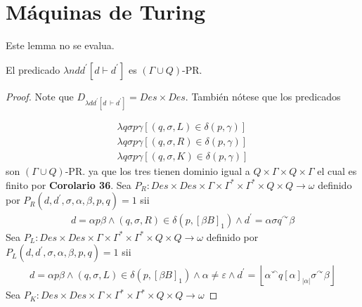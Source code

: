 \section{Máquinas de Turing}

  \begin{lemma}
    \par Este lemma no se evalua.
  \end{lemma}

  \begin{lemma}
  	El predicado $\lambda ndd^{\prime} \left[d\vdash d^{\prime}\right]$ es $(\Gamma \cup Q)$-PR.
	\begin{proof}
	  Note que $D_{\lambda dd^{\prime}\left[d\ \vdash d^{\prime }\right] }=Des\times Des$.
    También nótese que los predicados

    \begin{eqnarray*}
      \lambda q\sigma p\gamma \left[ (q,\sigma ,L)\in \delta (p,\gamma )\right] \\
      \lambda q\sigma p\gamma \left[ (q,\sigma ,R)\in \delta (p,\gamma )\right] \\
      \lambda q\sigma p\gamma \left[ (q,\sigma ,K)\in \delta (p,\gamma )\right]
    \end{eqnarray*}
    son $(\Gamma \cup Q)$-PR. ya que los tres tienen dominio igual a $Q\times \Gamma \times Q\times \Gamma $ el cual es
    finito por \textbf{Corolario 36}.
    Sea $P_{R}:Des\times Des\times\Gamma\times\Gamma ^{\ast }\times \Gamma ^{\ast }\times Q\times Q\rightarrow \omega $
    definido por $P_{R}(d,d^{\prime },\sigma ,\alpha ,\beta ,p,q)=1$ sii
    \begin{eqnarray*}
      d=\alpha p\beta \wedge (q,\sigma ,R)\in \delta \left( p,\left[ \beta B\right] _{1}\right) \wedge
      d^{\prime }=\alpha \sigma q^{\curvearrowright }\beta
    \end{eqnarray*}
    Sea $P_{L}:Des\times Des\times\Gamma\times\Gamma ^{\ast }\times \Gamma ^{\ast }\times Q\times Q\rightarrow \omega$
    definido por $P_{L}(d,d^{\prime },\sigma ,\alpha ,\beta ,p,q)=1$ sii
    \begin{eqnarray*}
      d=\alpha p\beta \wedge
      (q,\sigma ,L)\in \delta \left( p,\left[ \beta B\right] _{1}\right) \wedge
      \alpha \neq \varepsilon \wedge
      d^{\prime }=\left\lfloor \alpha ^{\curvearrowleft }q\left[ \alpha \right]
      _{\left\vert \alpha \right\vert }\sigma ^{\curvearrowright }\beta \right\rfloor
    \end{eqnarray*}
    Sea $P_{K}:Des\times Des\times\Gamma\times \Gamma ^{\ast }\times \Gamma ^{\ast }\times Q\times Q\rightarrow \omega$

\end{proof}
\end{lemma}
